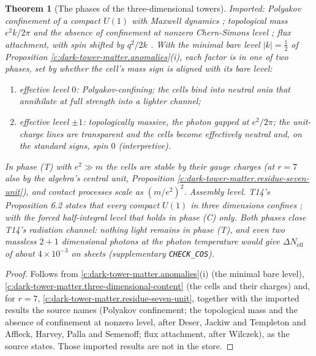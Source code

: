 \documentclass[11pt]{article}
\newtheorem{theorem}{Theorem}[section]
\theoremstyle{definition}
\theoremstyle{plain}
\newcommand{\changedmark}[2]{\marginpar{\raggedright\scriptsize\color{#1}#2}}
\providecommand{\Neff}{}\renewcommand{\Neff}{N_{\mathrm{eff}}}
\providecommand{\file}{}\renewcommand{\file}[1]{\texttt{#1}}
\begin{document}
\begin{theorem}[The phases of the three-dimensional towers]\label{c:dark-tower-matter.three-dimensional-phases}
\changedmark{BurntOrange}{changed since the deposit}
Imported: Polyakov confinement of a compact $U(1)$ with Maxwell dynamics \cite{Polyakov1977}; topological mass $e^{2}k/2\pi$ and the absence of confinement at nonzero Chern-Simons level \cite{DJT1982, AHPS1989}; flux attachment, with spin shifted by $q^{2}/2k$ \cite{Wilczek1982}. With the minimal bare level $|k| = \tfrac{1}{2}$ of Proposition \ref{c:dark-tower-matter.anomalies}(i), each factor is in one of two phases, set by whether the cell's mass sign is aligned with its bare level:
\begin{enumerate}
\item[(C)] effective level $0$: Polyakov-confining; the cells bind into neutral onia that annihilate at full strength into a lighter channel;
\item[(T)] effective level $\pm 1$: topologically massive, the photon gapped at $e^{2}/2\pi$; the unit-charge lines are transparent and the cells become effectively neutral and, on the standard signs, spin $0$ (interpretive).
\end{enumerate}
In phase (T) with $e^{2} \gg m$ the cells are stable by their gauge charges (at $r = 7$ also by the algebra's central unit, Proposition \ref{c:dark-tower-matter.residue-seven-unit}), and contact processes scale as $(m/e^{2})^{2}$. Assembly level. T14's Proposition 6.2 states that every compact $U(1)$ in three dimensions confines \cite[Prop.~6.2]{ButlerT14}; with the forced half-integral level that holds in phase (C) only. Both phases close T14's radiation channel: nothing light remains in phase (T), and even two massless $2+1$ dimensional photons at the photon temperature would give $\Delta\Neff$ of about $4 \times 10^{-3}$ on sheets (supplementary \file{CHECK\_COS}).
\end{theorem}
\begin{proof}
Follows from \ref{c:dark-tower-matter.anomalies}(i) (the minimal bare level), \ref{c:dark-tower-matter.three-dimensional-content} (the cells and their charges) and, for $r = 7$, \ref{c:dark-tower-matter.residue-seven-unit}, together with the imported results the source names (Polyakov confinement; the topological mass and the absence of confinement at nonzero level, after Deser, Jackiw and Templeton and Affleck, Harvey, Palla and Semenoff; flux attachment, after Wilczek), as the source states. Those imported results are not in the store.

\end{proof}
\end{document}

